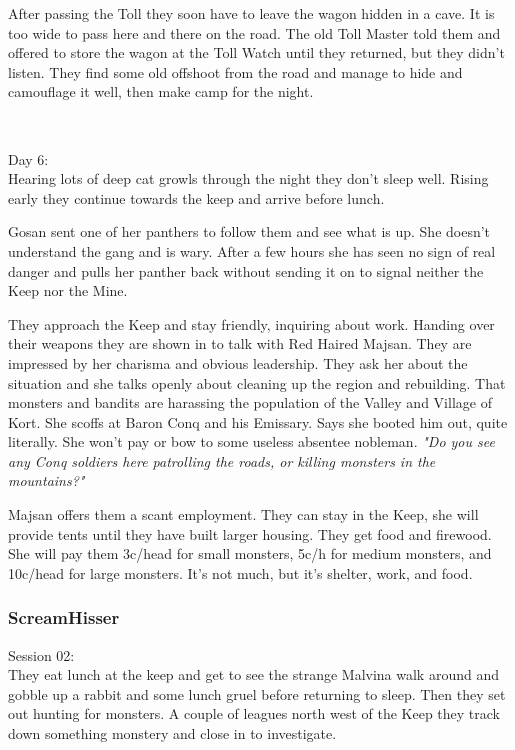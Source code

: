 After passing the Toll they soon have to leave the wagon hidden in a cave. It is too wide to pass here and there on the road. The old Toll Master told them and offered to store the wagon at the Toll Watch until they returned, but they didn't listen. They find some old offshoot from the road and manage to hide and camouflage it well, then make camp for the night.

\

Day 6:\\
Hearing lots of deep cat growls through the night they don't sleep well. Rising early they continue towards the keep and arrive before lunch.

\begin{readoutloud}
Gosan sent one of her panthers to follow them and see what is up. She doesn't understand the gang and is wary. After a few hours she has seen no sign of real danger and pulls her panther back without sending it on to signal neither the Keep nor the Mine.
\end{readoutloud}

They approach the Keep and stay friendly, inquiring about work. Handing over their weapons they are shown in to talk with Red Haired Majsan. They are impressed by her charisma and obvious leadership. They ask her about the situation and she talks openly about cleaning up the region and rebuilding. That monsters and bandits are harassing the population of the Valley and Village of Kort. She scoffs at Baron Conq and his Emissary. Says she booted him out, quite literally. She won't pay or bow to some useless absentee nobleman. \textit{"Do you see any Conq soldiers here patrolling the roads, or killing monsters in the mountains?"}

Majsan offers them a scant employment. They can stay in the Keep, she will provide tents until they have built larger housing. They get food and firewood. She will pay them 3c/head for small monsters, 5c/h for medium monsters, and 10c/head for large monsters. It's not much, but it's shelter, work, and food.


\subsubsection*{ScreamHisser}
\forceindent Session 02:\\                                              %
They eat lunch at the keep and get to see the strange Malvina walk around and gobble up a rabbit and some lunch gruel before returning to sleep. Then they set out hunting for monsters.
A couple of leagues north west of the Keep they track down something monstery and close in to investigate.

